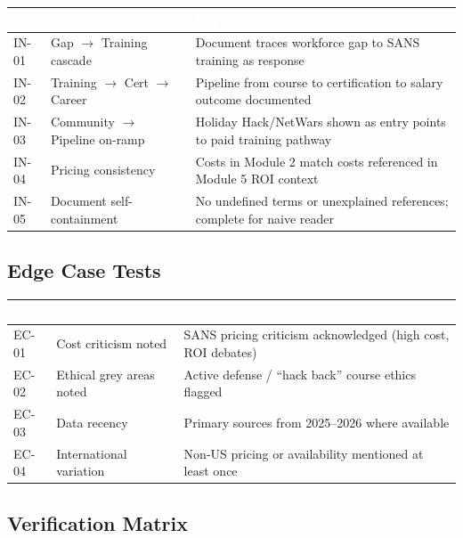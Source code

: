 \documentclass[11pt,letterpaper]{article}
\newcommand{\tableheader}[1]{\textbf{\sffamily\textcolor{white}{#1}}}
\begin{document}
\begin{center}
\begin{tabularx}{\textwidth}{C{1.2cm}L{3cm}X}
\toprule
{}
\tableheader{ID} & \tableheader{Verifies} & \tableheader{Expected} \\
\midrule
IN-01 & Gap $\rightarrow$ Training cascade & Document traces workforce gap to SANS training as response \\
IN-02 & Training $\rightarrow$ Cert $\rightarrow$ Career & Pipeline from course to certification to salary outcome documented \\
IN-03 & Community $\rightarrow$ Pipeline on-ramp & Holiday Hack/NetWars shown as entry points to paid training pathway \\
IN-04 & Pricing consistency & Costs in Module 2 match costs referenced in Module 5 ROI context \\
IN-05 & Document self-containment & No undefined terms or unexplained references; complete for naive reader \\
\bottomrule
\end{tabularx}
\end{center}

\subsection{Edge Case Tests}

\begin{center}
\begin{tabularx}{\textwidth}{C{1.2cm}L{3cm}X}
\toprule
{}
\tableheader{ID} & \tableheader{Verifies} & \tableheader{Expected} \\
\midrule
EC-01 & Cost criticism noted & SANS pricing criticism acknowledged (high cost, ROI debates) \\
EC-02 & Ethical grey areas noted & Active defense / ``hack back'' course ethics flagged \\
EC-03 & Data recency & Primary sources from 2025--2026 where available \\
EC-04 & International variation & Non-US pricing or availability mentioned at least once \\
\bottomrule
\end{tabularx}
\end{center}

\subsection{Verification Matrix}
\end{document}

